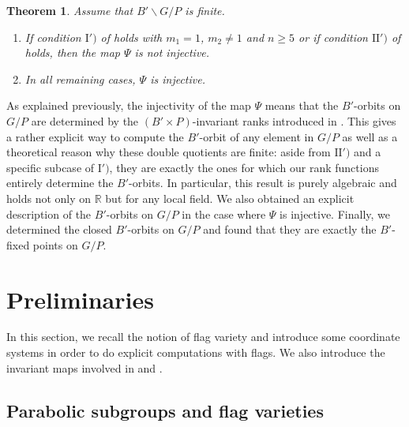 \documentclass[pdftex]{sigma}
\numberwithin{equation}{section}
\theoremstyle{definition}
\newcommand{\R}{\mathbb{R}}
\newcounter{theoremintro}
\theoremstyle{plain}
\theoremstyle{plain}
\newtheorem{Theorem*}[theoremintro]{Theorem}
\theoremstyle{plain}
\theoremstyle{plain}
\begin{document}
\begin{Theorem*}
	Assume that $B'\backslash G/P$ is finite.
	\begin{enumerate}[label = \roman*)]
		\item If condition $\mathrm{I}')$ of  holds with $m_1 = 1$, $m_2 \neq 1$ and $n \geqslant 5$ or if condition $\mathrm{II}')$ of  holds, then the map $\Psi$ is not injective.
		\item In all remaining cases, $\Psi$ is injective.
	\end{enumerate}
\end{Theorem*}
As explained previously, the injectivity of the map $\Psi$ means that the $B'$-orbits on $G/P$ are determined by the $(B' \times P)$-invariant ranks introduced in .
This gives a rather explicit way to compute the $B'$-orbit of any element in $G/P$ as well as a theoretical reason why these double quotients are finite: aside from $\mathrm{II}')$ and a specific subcase of $\mathrm{I}')$, they are exactly the ones for which our rank functions entirely determine the $B'$-orbits.
In particular, this result is purely algebraic and holds not only on $\R$ but for any local field.
We also obtained an explicit description of the $B'$-orbits on $G/P$ in the case where $\Psi$ is injective. Finally, we determined the closed $B'$-orbits on $G/P$ and found that they are exactly the $B'$-fixed points on $G/P$.


\section{Preliminaries}

In this section, we recall the notion of flag variety and introduce some coordinate systems in order to do explicit computations with flags. We also introduce the invariant maps involved in  and .

\subsection{Parabolic subgroups and flag varieties}{\label{flag varieties}}
\end{document}
